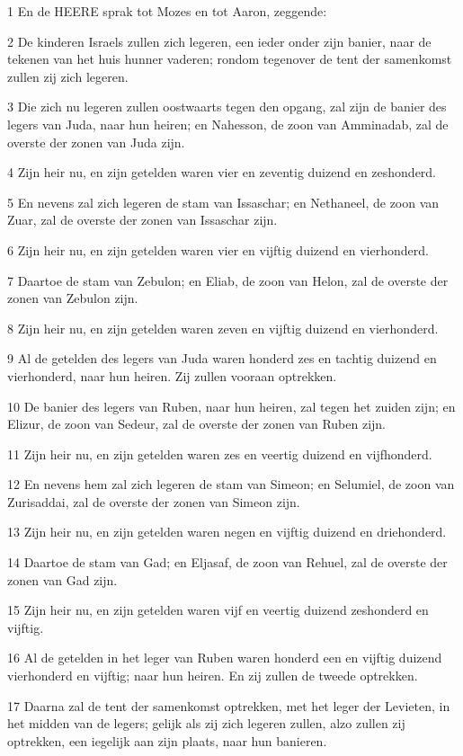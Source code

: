 \par 1 En de HEERE sprak tot Mozes en tot Aaron, zeggende:
\par 2 De kinderen Israels zullen zich legeren, een ieder onder zijn banier, naar de tekenen van het huis hunner vaderen; rondom tegenover de tent der samenkomst zullen zij zich legeren.
\par 3 Die zich nu legeren zullen oostwaarts tegen den opgang, zal zijn de banier des legers van Juda, naar hun heiren; en Nahesson, de zoon van Amminadab, zal de overste der zonen van Juda zijn.
\par 4 Zijn heir nu, en zijn getelden waren vier en zeventig duizend en zeshonderd.
\par 5 En nevens zal zich legeren de stam van Issaschar; en Nethaneel, de zoon van Zuar, zal de overste der zonen van Issaschar zijn.
\par 6 Zijn heir nu, en zijn getelden waren vier en vijftig duizend en vierhonderd.
\par 7 Daartoe de stam van Zebulon; en Eliab, de zoon van Helon, zal de overste der zonen van Zebulon zijn.
\par 8 Zijn heir nu, en zijn getelden waren zeven en vijftig duizend en vierhonderd.
\par 9 Al de getelden des legers van Juda waren honderd zes en tachtig duizend en vierhonderd, naar hun heiren. Zij zullen vooraan optrekken.
\par 10 De banier des legers van Ruben, naar hun heiren, zal tegen het zuiden zijn; en Elizur, de zoon van Sedeur, zal de overste der zonen van Ruben zijn.
\par 11 Zijn heir nu, en zijn getelden waren zes en veertig duizend en vijfhonderd.
\par 12 En nevens hem zal zich legeren de stam van Simeon; en Selumiel, de zoon van Zurisaddai, zal de overste der zonen van Simeon zijn.
\par 13 Zijn heir nu, en zijn getelden waren negen en vijftig duizend en driehonderd.
\par 14 Daartoe de stam van Gad; en Eljasaf, de zoon van Rehuel, zal de overste der zonen van Gad zijn.
\par 15 Zijn heir nu, en zijn getelden waren vijf en veertig duizend zeshonderd en vijftig.
\par 16 Al de getelden in het leger van Ruben waren honderd een en vijftig duizend vierhonderd en vijftig; naar hun heiren. En zij zullen de tweede optrekken.
\par 17 Daarna zal de tent der samenkomst optrekken, met het leger der Levieten, in het midden van de legers; gelijk als zij zich legeren zullen, alzo zullen zij optrekken, een iegelijk aan zijn plaats, naar hun banieren.
